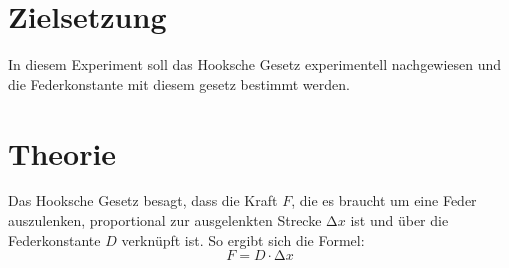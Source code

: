 


\section{Zielsetzung}
\label{sec:Theorie}
In diesem Experiment soll das Hooksche Gesetz experimentell nachgewiesen und die Federkonstante mit diesem gesetz bestimmt 
werden.

\section{Theorie}
Das Hooksche Gesetz besagt, dass die Kraft $F$, die es braucht um eine Feder auszulenken, proportional zur ausgelenkten 
Strecke $\increment x$ ist und über die Federkonstante $D$ verknüpft ist.
So ergibt sich die Formel:
\begin{equation}
    F = D \cdot \increment x
    \label{eq:Hook}
\end{equation}


